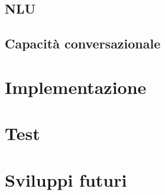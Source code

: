 	\subsection{NLU}
	\subsection{Capacità conversazionale}

\section{Implementazione}

\section{Test}

\section{Sviluppi futuri}
